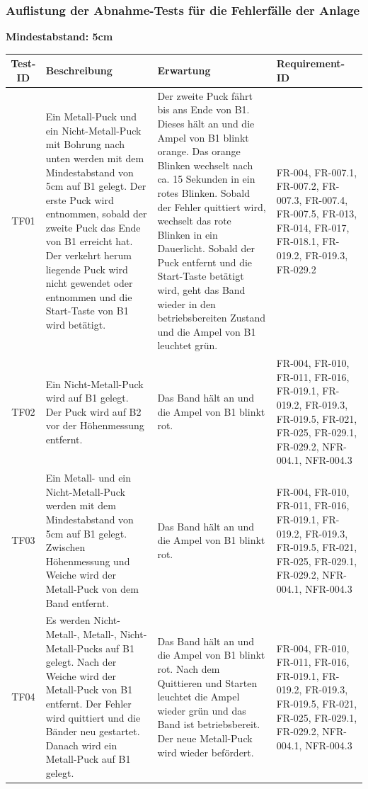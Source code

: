 \documentclass[oneside,a4paper,titlepage]{scrartcl}              %
\begin{document}
\newpage

\subsubsection{Auflistung der Abnahme-Tests für die Fehlerfälle der Anlage}
\textbf{Mindestabstand: 5cm}
\begin{small}
  \begin{center}
    \begin{longtable}{|c|p{4cm}|p{6cm}|C{3cm}|}
      \hline
      \textbf{Test-ID} & \textbf{Beschreibung} & \textbf{Erwartung} & \textbf{Requirement-ID}\\
      \toprule
      \endhead
      \hline
      TF01 & Ein Metall-Puck und ein Nicht-Metall-Puck mit Bohrung nach unten werden mit dem Mindestabstand von 5cm auf B1 gelegt. Der erste Puck wird entnommen, sobald der zweite Puck das Ende von B1 erreicht hat. Der verkehrt herum liegende Puck wird nicht gewendet oder entnommen und die Start-Taste von B1 wird betätigt. & Der zweite Puck fährt bis ans Ende von B1. Dieses hält an und die Ampel von B1 blinkt orange. Das orange Blinken wechselt nach ca. 15 Sekunden in ein rotes Blinken. Sobald der Fehler quittiert wird, wechselt das rote Blinken in ein Dauerlicht. Sobald der Puck entfernt und die Start-Taste betätigt wird, geht das Band wieder in den betriebsbereiten Zustand und die Ampel von B1 leuchtet grün. & FR-004, FR-007.1, FR-007.2, FR-007.3, FR-007.4, FR-007.5, FR-013, FR-014, FR-017, FR-018.1, FR-019.2, FR-019.3, FR-029.2\\
      \hline
       TF02 & Ein Nicht-Metall-Puck wird auf B1 gelegt. Der Puck wird auf B2 vor der Höhenmessung entfernt. & Das Band hält an und die Ampel von B1 blinkt rot. & FR-004, FR-010, FR-011, FR-016, FR-019.1, FR-019.2, FR-019.3, FR-019.5, FR-021, FR-025, FR-029.1, FR-029.2, NFR-004.1, NFR-004.3\\
      \hline
      TF03 & Ein Metall- und ein Nicht-Metall-Puck werden mit dem Mindestabstand von 5cm auf B1 gelegt. Zwischen Höhenmessung und Weiche wird der Metall-Puck von dem Band entfernt. & Das Band hält an und die Ampel von B1 blinkt rot. & FR-004, FR-010, FR-011, FR-016, FR-019.1, FR-019.2, FR-019.3, FR-019.5, FR-021, FR-025, FR-029.1, FR-029.2, NFR-004.1, NFR-004.3\\
      \hline
       TF04 & Es werden Nicht-Metall-, Metall-, Nicht-Metall-Pucks auf B1 gelegt. Nach der Weiche wird der Metall-Puck von B1 entfernt. Der Fehler wird quittiert und die Bänder neu gestartet. Danach wird ein Metall-Puck auf B1 gelegt. & Das Band hält an und die Ampel von B1 blinkt rot. Nach dem Quittieren und Starten leuchtet die Ampel wieder grün und das Band ist betriebsbereit. Der neue Metall-Puck wird wieder befördert. & FR-004, FR-010, FR-011, FR-016, FR-019.1, FR-019.2, FR-019.3, FR-019.5, FR-021, FR-025, FR-029.1, FR-029.2, NFR-004.1, NFR-004.3\\

\end{longtable}
\end{center}
\end{small}
\end{document}
